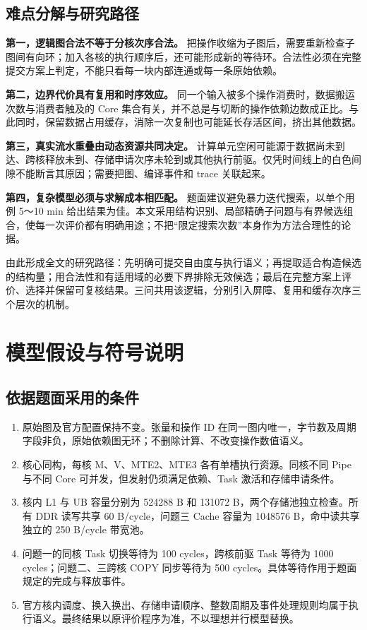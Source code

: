 \documentclass[anonymous,notoc]{gmcm2026}
\providecommand{\tightlist}{\setlength{\itemsep}{0pt}\setlength{\parskip}{0pt}}
\begin{document}
\subsection{难点分解与研究路径}\label{ux96beux70b9ux5206ux89e3ux4e0eux7814ux7a76ux8defux5f84}

\textbf{第一，逻辑图合法不等于分核次序合法。} 把操作收缩为子图后，需要重新检查子图间有向环；加入各核的执行顺序后，还可能形成新的等待环。合法性必须在完整提交方案上判定，不能只看每一块内部连通或每一条原始依赖。

\textbf{第二，边界代价具有复用和时序效应。} 同一个输入被多个操作消费时，数据搬运次数与消费者触及的 Core 集合有关，并不总是与切断的操作依赖边数成正比。与此同时，保留数据占用缓存，消除一次复制也可能延长存活区间，挤出其他数据。

\textbf{第三，真实流水重叠由动态资源共同决定。} 计算单元空闲可能源于数据尚未到达、跨核释放未到、存储申请次序未轮到或其他执行前驱。仅凭时间线上的白色间隙不能断言其原因；需要把图、编译事件和 trace 关联起来。

\textbf{第四，复杂模型必须与求解成本相匹配。} 题面建议避免暴力迭代搜索，以单个用例 5～10 min 给出结果为佳。本文采用结构识别、局部精确子问题与有界候选组合，使每一次评价都有明确用途；不把``限定搜索次数''本身作为方法合理性的论据。

由此形成全文的研究路径：先明确可提交自由度与执行语义；再提取适合构造候选的结构量；用合法性和有适用域的必要下界排除无效候选；最后在完整方案上评价、选择并保留可复核结果。三问共用该逻辑，分别引入屏障、复用和缓存次序三个层次的机制。

\FloatBarrier

\section{模型假设与符号说明}\label{ux6a21ux578bux5047ux8bbeux4e0eux7b26ux53f7ux8bf4ux660e}

\subsection{依据题面采用的条件}\label{ux4f9dux636eux9898ux9762ux91c7ux7528ux7684ux6761ux4ef6}

\begin{enumerate}
\def\labelenumi{\arabic{enumi}.}
\tightlist
\item
  原始图及官方配置保持不变。张量和操作 ID 在同一图内唯一，字节数及周期字段非负，原始依赖图无环；不删除计算、不改变操作数值语义。
\item
  核心同构，每核 M、V、MTE2、MTE3 各有单槽执行资源。同核不同 Pipe 与不同 Core 可并发，但发射仍须满足依赖、Task 激活和存储申请条件。
\item
  核内 L1 与 UB 容量分别为 524288 B 和 131072 B，两个存储池独立检查。所有 DDR 读写共享 60 B/cycle，问题三 Cache 容量为 1048576 B，命中读共享独立的 250 B/cycle 带宽池。
\item
  问题一的同核 Task 切换等待为 100 cycles，跨核前驱 Task 等待为 1000 cycles；问题二、三跨核 COPY 同步等待为 500 cycles。具体等待作用于题面规定的完成与释放事件。
\item
  官方核内调度、换入换出、存储申请顺序、整数周期及事件处理规则均属于执行语义。最终结果以原评价程序为准，不以理想并行模型替换。
\end{enumerate}
\end{document}
